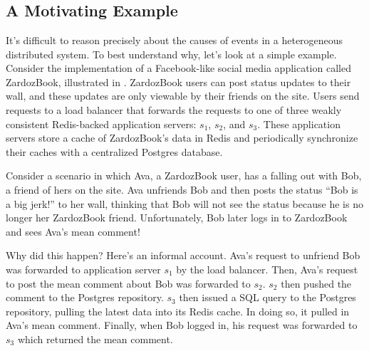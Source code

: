 \section{\WatProvenance{}}

\subsection{A Motivating Example}
\newcommand{\systemname}{ZardozBook}
It's difficult to reason precisely about the causes of events in a
heterogeneous distributed system. To best understand why, let's look at a
simple example. Consider the implementation of a Facebook-like social media
application called \systemname{}, illustrated in .
\systemname{} users can post status updates to their wall, and these updates
are only viewable by their friends on the site. Users send requests to a load
balancer that forwards the requests to one of three weakly consistent
Redis-backed application servers: $s_1$, $s_2$, and $s_3$. These application
servers store a cache of \systemname{}'s data in Redis and periodically
synchronize their caches with a centralized Postgres database.

Consider a scenario in which Ava, a \systemname{} user, has a falling out with
Bob, a friend of hers on the site. Ava unfriends Bob and then posts the status
``Bob is a big jerk!'' to her wall, thinking that Bob will not see the status
because he is no longer her \systemname{} friend. Unfortunately, Bob later logs
in to \systemname{} and sees Ava's mean comment!

{}

Why did this happen? Here's an informal account. Ava's request to unfriend Bob
was forwarded to application server $s_1$ by the load balancer. Then, Ava's
request to post the mean comment about Bob was forwarded to $s_2$. $s_2$ then
pushed the comment to the Postgres repository. $s_3$ then issued a SQL query
to the Postgres repository, pulling the latest data into its Redis cache. In
doing so, it pulled in Ava's mean comment. Finally, when Bob logged in, his
request was forwarded to $s_3$ which returned the mean comment.

